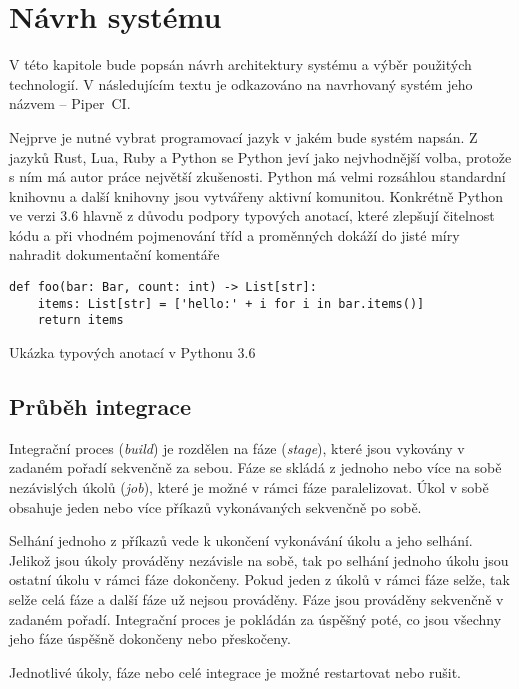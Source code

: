 \chapter{Návrh systému}

V této kapitole bude popsán návrh architektury systému a výběr použitých technologií.
V následujícím textu je odkazováno na navrhovaný systém jeho názvem -- Piper~CI.

Nejprve je nutné vybrat programovací jazyk v jakém bude systém napsán.
Z jazyků Rust, Lua, Ruby a Python se Python jeví jako nejvhodnější volba, protože s ním má autor práce největší zkušenosti.
Python má velmi rozsáhlou standardní knihovnu a další knihovny jsou vytvářeny aktivní komunitou.
Konkrétně Python ve verzi 3.6 hlavně z důvodu podpory typových anotací, které zlepšují čitelnost kódu a při vhodném pojmenování tříd a proměnných dokáží do jisté míry nahradit dokumentační komentáře

\begin{listing}[ht]
\begin{verbatim}
def foo(bar: Bar, count: int) -> List[str]:
    items: List[str] = ['hello:' + i for i in bar.items()]
    return items
\end{verbatim}
\caption{Ukázka typových anotací v Pythonu 3.6}
\end{listing}

\section{Průběh integrace}

Integrační proces (\textit{build}) je rozdělen na fáze (\textit{stage}), které jsou vykovány v zadaném pořadí sekvenčně za sebou.
Fáze se skládá z jednoho nebo více na sobě nezávislých úkolů (\textit{job}), které je možné v rámci fáze paralelizovat. 
Úkol v sobě obsahuje jeden nebo více příkazů vykonávaných sekvenčně po sobě.

Selhání jednoho z příkazů vede k ukončení vykonávání úkolu a jeho selhání.
Jelikož jsou úkoly prováděny nezávisle na sobě, tak po selhání jednoho úkolu jsou ostatní úkolu v rámci fáze dokončeny.
Pokud jeden z úkolů v rámci fáze selže, tak selže celá fáze a další fáze už nejsou prováděny.
Fáze jsou prováděny sekvenčně v zadaném pořadí.
Integrační proces je pokládán za úspěšný poté, co jsou všechny jeho fáze úspěšně dokončeny nebo přeskočeny.

Jednotlivé úkoly, fáze nebo celé integrace je možné restartovat nebo rušit.

